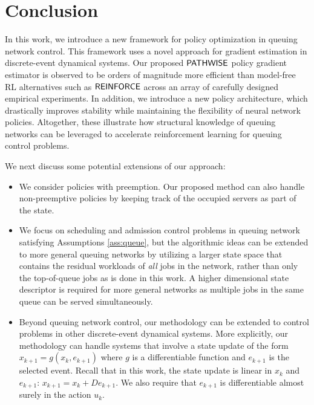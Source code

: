 \section{Conclusion}
\label{section:conclusion}

In this work, we introduce a new framework for policy optimization in queuing network control. This framework uses a novel approach for gradient estimation in discrete-event dynamical systems. Our proposed $\mathsf{PATHWISE}$ policy gradient estimator is observed to be orders of magnitude more efficient than model-free RL alternatives such as $\mathsf{REINFORCE}$ across an array of carefully designed empirical experiments. In addition, we introduce a new policy architecture, which drastically improves stability while maintaining the flexibility of neural network policies. Altogether, these illustrate how structural knowledge of queuing networks can be leveraged to accelerate reinforcement learning for queuing control problems.

We next discuss some potential extensions of our approach:
\begin{itemize}[itemsep=0pt]
    \item We consider policies with preemption. Our proposed method can also handle non-preemptive policies by keeping track of the occupied servers as part of the state.
    \item We focus on scheduling and admission control problems in queuing network satisfying Assumptions \ref{ass:queue}, but the algorithmic ideas can be extended to more general queuing networks by utilizing a larger state space that contains the residual workloads of \emph{all} jobs in the network, rather than only the top-of-queue jobs as is done in this work. A higher dimensional state descriptor is required for more general networks as multiple jobs in the same queue can be served simultaneously.
    \item Beyond queuing network control, our methodology can be extended to control problems in other discrete-event dynamical systems. More explicitly, our methodology can handle systems that involve a state update of the form $x_{k+1} = g(x_{k}, e_{k+1})$ where $g$ is a differentiable function and $e_{k+1}$ is the selected event. Recall that in this work, the state update is linear in $x_{k}$ and $e_{k+1}$: $x_{k+1} = x_{k} + De_{k+1}$. We also require that $e_{k+1}$ is differentiable almost surely in the action $u_{k}$. 
\end{itemize}